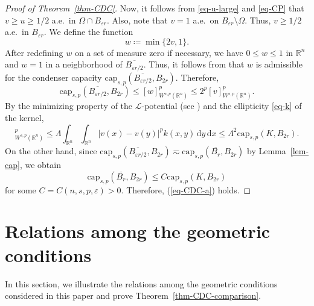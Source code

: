 \documentclass[11pt]{amsart}
\theoremstyle{plain}
\theoremstyle{definition}
\numberwithin{equation}{section}
\begin{document}
\begin{proof}[Proof of Theorem~\ref{thm-CDC}]
Now, it follows from \eqref{eq-u-large} and \eqref{eq-CP} that $v \geq u \geq 1/2$ a.e.\ in $\Omega \cap B_{\varepsilon r}$. Also, note that $v = 1$ a.e.\ on $B_{\varepsilon r} \setminus \Omega$. Thus, $v \geq 1/2$ a.e.\ in $B_{\varepsilon r}$. We define the function
\begin{equation*}
w \coloneqq \min\{2v, 1\}.
\end{equation*}
After redefining $w$ on a set of measure zero if necessary, we have $0 \leq w \leq 1$ in $\mathbb{R}^n$ and $w=1$ in a neighborhood of $\overline{B_{\varepsilon r/2}}$. Thus, it follows from \cite[Proposition~6.2]{BBK24} that $w$ is admissible for the condenser capacity $\mathrm{cap}_{s, p}(\overline{B_{\varepsilon r/2}}, B_{2r})$. Therefore,
\begin{equation*}
\mathrm{cap}_{s, p}(\overline{B_{\varepsilon r/2}}, B_{2r}) \leq [w]^p_{W^{s, p}(\mathbb{R}^n)} \leq 2^p [v]_{W^{s, p}(\mathbb{R}^n)}^p.
\end{equation*}
By the minimizing property of the $\mathcal{L}$-potential (see \cite[Lemma~2.16(iii)]{KLL23}) and the ellipticity \eqref{eq-k} of the kernel,
\begin{equation*}
[v]_{W^{s, p}(\mathbb{R}^n)}^p \leq \Lambda \int_{\mathbb{R}^n} \int_{\mathbb{R}^n} |v(x)-v(y)|^p k(x, y) \,\mathrm{d}y \,\mathrm{d}x \leq \Lambda^2 \mathrm{cap}_{s, p}(K, B_{2r}).
\end{equation*}
On the other hand, since $\mathrm{cap}_{s, p}(\overline{B_{\varepsilon r/2}}, B_{2r}) \eqsim \mathrm{cap}_{s, p}(\overline{B_{r}}, B_{2r})$ by Lemma~\ref{lem-cap}, we obtain
\begin{equation*}
\mathrm{cap}_{s, p}(\overline{B_{r}}, B_{2r}) \leq C \mathrm{cap}_{s, p}(K, B_{2r})
\end{equation*}
for some $C=C(n, s, p, \varepsilon)>0$. Therefore, (\ref{eq-CDC-a}) holds.
\end{proof}



\section{Relations among the geometric conditions}
\label{sec:examples}

In this section, we illustrate the relations among the geometric conditions considered in this paper and prove Theorem~\ref{thm-CDC-comparison}.
\end{document}
